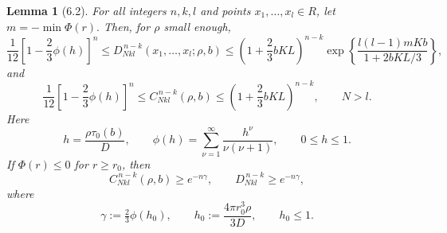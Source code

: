 \documentclass[11pt]{article}
\newtheorem{lemma}{Lemma}
\begin{document}
\begin{lemma}[6.2]\label{lem:bounds}
    For all integers $n,k,l$ and points $x_1,\ldots,x_l \in R$, let $m = -\min \Phi(r).$
Then, for $\rho$ small enough,
\begin{equation}
\frac{1}{12}\left[1-\frac{2}{3}\phi(h)\right]^n
\le
D^{\,n-k}_{N kl}(x_1,\ldots,x_l;\rho,b)
\le
\left(1+\frac{2}{3}bKL\right)^{n-k}
\exp\!\left\{\frac{l(l-1)mKb}{1+2bKL/3}\right\},
\tag{6.6}\label{6.6}
\end{equation}
and
\begin{equation}
\frac{1}{12}\left[1-\frac{2}{3}\phi(h)\right]^n
\le
C^{\,n-k}_{N kl}(\rho,b)
\le
\left(1+\frac{2}{3}bKL\right)^{n-k},
\qquad N>l .
\tag{6.7}\label{6.7}
\end{equation}
Here
\[
h=\frac{\rho \tau_0(b)}{D},
\qquad
\phi(h)=\sum_{\nu=1}^{\infty}\frac{h^\nu}{\nu(\nu+1)},
\qquad
0\le h\le1 .
\]
If $\Phi(r)\le0$ for $r\ge r_0$, then
\begin{equation}
C^{\,n-k}_{N kl}(\rho,b)\ge e^{-n\gamma},
\qquad
D^{\,n-k}_{N kl}\ge e^{-n\gamma},
\tag{6.8}\label{6.8}
\end{equation}
where
\[
\gamma :=\tfrac23\phi(h_0),
\qquad
h_0:=\frac{4\pi r_0^3\rho}{3D},
\qquad
h_0\le1 .
\]

\end{lemma}
\end{document}
